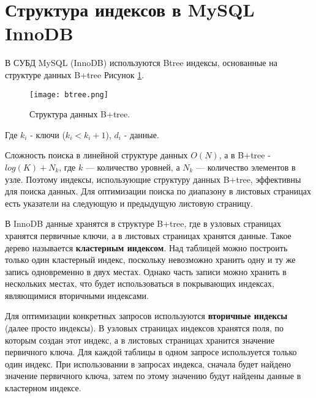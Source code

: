 \section{Структура индексов в MySQL InnoDB}

В СУБД MySQL (InnoDB) используются Btree индексы, основанные на структуре данных B+tree Рисунок \ref{img:btree-structure}.

\begin{figure}[H]
  \centering
  \texttt{[image: btree.png]}
  \caption{Структура данных B+tree.}
  \label{img:btree-structure}
\end{figure}

Где
$k_i$ - ключи ($k_i < k_i + 1$),
$d_i$ - данные.

Сложность поиска в линейной структуре данных $O(N)$, а в B+tree - $log(K)+N_k$, где $k$ — количество уровней, а $N_k$ — количество элементов в узле. Поэтому индексы, использующие структуру данных B+tree, эффективны для поиска данных. Для оптимизации поиска по диапазону в листовых страницах есть указатели на следующую и предыдущую листовую страницу.

В InnoDB данные хранятся в структуре B+tree, где в узловых страницах хранятся первичные ключи, а в листовых страницах хранятся данные. Такое дерево называется \textbf{кластерным индексом}. Над таблицей можно построить только один кластерный индекс, поскольку невозможно хранить одну и ту же запись одновременно в двух местах. Однако часть записи можно хранить в нескольких местах, что будет использоваться в покрывающих индексах, являющимися вторичными индексами.

Для оптимизации конкретных запросов используются \textbf{вторичные индексы} (далее просто индексы). В узловых страницах индексов хранятся поля, по которым создан этот индекс, а в листовых страницах хранится значение первичного ключа. Для каждой таблицы в одном запросе используется только один индекс. При использовании в запросах индекса, сначала будет найдено значение первичного ключа, затем по этому значению будут найдены данные в кластерном индексе.